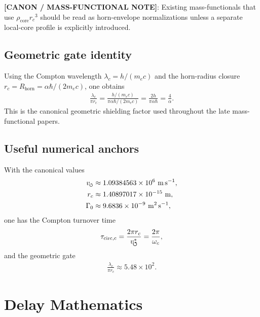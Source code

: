 \documentclass[11pt]{article}
\theoremstyle{definition}
\theoremstyle{plain}
\theoremstyle{remark}
\newcommand{\swirlarrow}{\mathchoice{\mkern-2mu\scriptstyle\boldsymbol{\circlearrowleft}}{\mkern-2mu\scriptstyle\boldsymbol{\circlearrowleft}}{\mkern-2mu\scriptscriptstyle\boldsymbol{\circlearrowleft}}{\mkern-2mu\scriptscriptstyle\boldsymbol{\circlearrowleft}}}
\newcommand{\rc}{{r_c}}
\newcommand{\vchar}{v_{\!\boldsymbol{\circlearrowleft}}^{\ast}}
\begin{document}
            \textbf{[CANON / MASS-FUNCTIONAL NOTE]}: Existing mass-functionals that use $\rho_{\mathrm{core}}\rc^3$ should be read as horn-envelope normalizations unless a separate local-core profile is explicitly introduced.

        \subsection{Geometric gate identity}
            Using the Compton wavelength $\lambda_c = h/(m_e c)$ and the horn-radius closure $r_c=R_{\mathrm{horn}} = \alpha\hbar/(2m_e c)$, one obtains
            \begin{align}
                \frac{\lambda_c}{\pi r_c}
                =
                \frac{h/(m_e c)}{\pi \alpha \hbar /(2m_e c)}
                =
                \frac{2h}{\pi \alpha \hbar}
                =
                \frac{4}{\alpha}.
            \end{align}
            This is the canonical geometric shielding factor used throughout the late mass-functional papers.

        \subsection{Useful numerical anchors}
            With the canonical values
            \begin{align}
                v_{\swirlarrow} &\approx 1.09384563\times 10^6\ \mathrm{m\,s^{-1}}, \\
                r_c &\approx 1.40897017\times 10^{-15}\ \mathrm{m}, \\
                \Gamma_0 &\approx 9.6836\times 10^{-9}\ \mathrm{m^2\,s^{-1}},
            \end{align}
            one has the Compton turnover time
            \begin{align}
                \tau_{\rm circ,c} = \frac{2\pi \rc}{\vchar} = \frac{2\pi}{\omega_c},
            \end{align}
            and the geometric gate
            \begin{align}
                \frac{\lambda_c}{\pi \rc} \approx 5.48\times 10^2.
            \end{align}

    \section{Delay Mathematics}
        \label{sec:appendix_delay}
\end{document}
